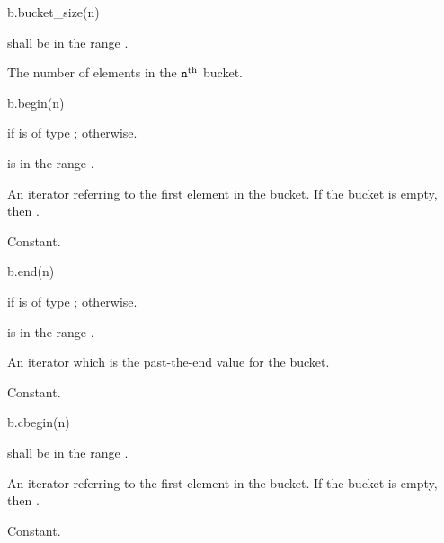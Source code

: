 %
\begin{itemdecl}
b.bucket_size(n)
\end{itemdecl}

\begin{itemdescr}
\pnum
\result
{}

\pnum
\expects
{} shall be in the range .

\pnum
\returns
The number of elements in the $\tcode{n}^\text{th}$ bucket.

\pnum
\complexity
{}
\end{itemdescr}

%
\begin{itemdecl}
b.begin(n)
\end{itemdecl}

\begin{itemdescr}
\pnum
\result
{} if  is of type ;
 otherwise.

\pnum
\expects
{} is in the range .

\pnum
\returns
An iterator referring to the first element in the bucket.
If the bucket is empty, then .

\pnum
\complexity
Constant.
\end{itemdescr}

%
\begin{itemdecl}
b.end(n)
\end{itemdecl}

\begin{itemdescr}
\pnum
\result
{} if  is of type ;
 otherwise.

\pnum
\expects
{} is in the range .

\pnum
\returns
An iterator which is the past-the-end value for the bucket.

\pnum
\complexity
Constant.
\end{itemdescr}

%
\begin{itemdecl}
b.cbegin(n)
\end{itemdecl}

\begin{itemdescr}
\pnum
\result
{}

\pnum
\expects
{} shall be in the range .

\pnum
\returns
An iterator referring to the first element in the bucket.
If the bucket is empty, then .

\pnum
\complexity
Constant.
\end{itemdescr}

